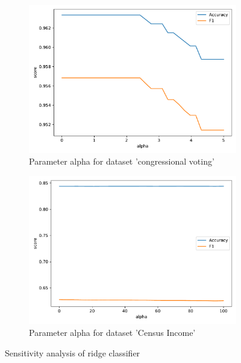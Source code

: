 \documentclass[a4paper,10pt]{article}
\begin{document}
\begin{figure}[h!]
    \captionsetup{justification=centering}
    \begin{subfigure}[b]{0.45\textwidth}
        \includegraphics[width=\textwidth]{congress/plots/RidgeClassifier_alpha_sensitivity_new.pdf}
        \caption{Parameter \textsf{alpha} for dataset 'congressional voting'}
    \end{subfigure}
    \hfill
    \begin{subfigure}[b]{0.45\textwidth}
        \includegraphics[width=\textwidth]{census/plots/RidgeClassifier_alpha_sensitivity.pdf}
        \caption{Parameter \textsf{alpha} for dataset 'Census Income'}
    \end{subfigure}
    \caption{Sensitivity analysis of ridge classifier}
    \label{fig: sensitivity ridge}
\end{figure}
\end{document}

